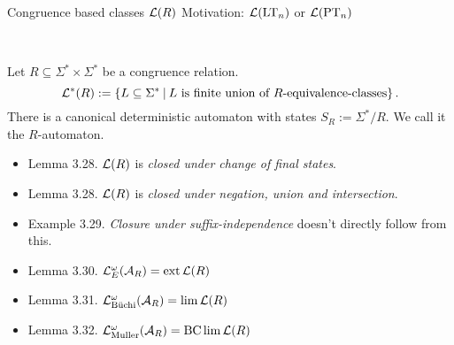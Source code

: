 \documentclass[
	handout,
	notheorems,noamsthm]{beamer}
\begin{document}
\begin{frame}[<+->]{Congruence based classes $\mathcal{L}(R)$}
Motivation: $\mathcal{L}(\textup{\textrm{LT}}_n)$ or $\mathcal{L}(\textup{\textrm{PT}}_n)$

\

Let $R\subseteq\Sigma^* \times \Sigma^*$ be a congruence relation.
\[ \Lang^*(R) := \Set{L \subseteq \Sigma^*}{L \text{ is finite union of $R$-equivalence-classes}} . \]
There is a canonical deterministic automaton with states $S_R := \Sigma^*/R$. We call it the $R$-automaton.

\begin{itemize}
\item Lemma 3.28. $\mathcal{L}(R)$ is \emph{closed under change of final states}.
\item Lemma 3.28. $\mathcal{L}(R)$ is \emph{closed under negation, union and intersection}.
\item Example 3.29. \emph{Closure under suffix-independence} doesn't directly follow from this.
%
\item Lemma 3.30. $\mathcal{L}^\omega_E(\mathcal{A}_R) = \operatorname{ext} \mathcal{L}(R)$
\item Lemma 3.31. $\mathcal{L}^\omega_{\text{Büchi}}(\mathcal{A}_R) = \lim \mathcal{L}(R)$
\item Lemma 3.32. $\mathcal{L}^\omega_{\text{Muller}}(\mathcal{A}_R) = \operatorname{BC} \lim \mathcal{L}(R)$
\end{itemize}
\end{frame}
\end{document}
